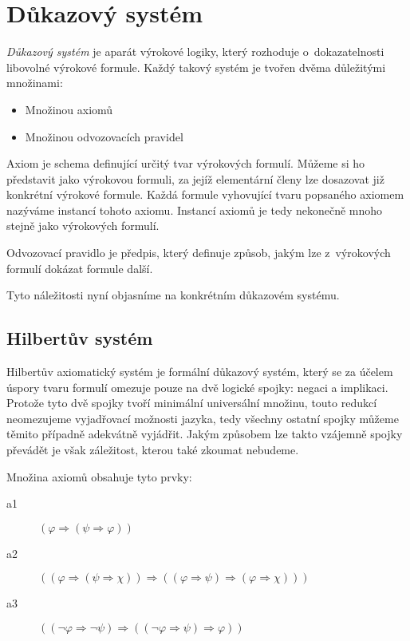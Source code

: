 \documentclass[thesis=B,czech,hidelinks]{FITthesis}[2012/06/26]
\begin{document}
\section{Důkazový systém}

\emph{Důkazový systém} je aparát výrokové logiky, který rozhoduje o~dokazatelnosti libovolné výrokové formule. Každý takový systém je tvořen dvěma důležitými množinami:

\begin{itemize}
	\item Množinou axiomů
	\item Množinou odvozovacích pravidel
\end{itemize}

Axiom je schema definující určitý tvar výrokových formulí. Můžeme si ho představit jako výrokovou formuli, za jejíž elementární členy lze dosazovat již konkrétní výrokové formule. Každá formule vyhovující tvaru popsaného axiomem nazýváme instancí tohoto axiomu. Instancí axiomů je tedy nekonečně mnoho stejně jako výrokových formulí.

Odvozovací pravidlo je předpis, který definuje způsob, jakým lze z~výrokových formulí dokázat formule další.

Tyto náležitosti nyní objasníme na konkrétním důkazovém systému.

\subsection{Hilbertův systém}

Hilbertův axiomatický systém je formální důkazový systém, který se za účelem úspory tvaru formulí omezuje pouze na dvě logické spojky: negaci a implikaci. Protože tyto dvě spojky tvoří minimální universální množinu, touto redukcí neomezujeme vyjadřovací možnosti jazyka, tedy všechny ostatní spojky můžeme těmito případně adekvátně vyjádřit\cite{logika}. Jakým způsobem lze takto vzájemně spojky převádět je však záležitost, kterou také zkoumat nebudeme.

Množina axiomů obsahuje tyto prvky:

\begin{description}
	\item[a1] $( \varphi \Rightarrow ( \psi \Rightarrow \varphi ))$
	\item[a2] $(( \varphi \Rightarrow ( \psi \Rightarrow \chi )) \Rightarrow (( \varphi \Rightarrow \psi ) \Rightarrow ( \varphi \Rightarrow \chi )))$
	\item[a3] $(( \neg \varphi \Rightarrow \neg \psi ) \Rightarrow (( \neg \varphi \Rightarrow \psi ) \Rightarrow \varphi ))$
\end{description}
\end{document}

